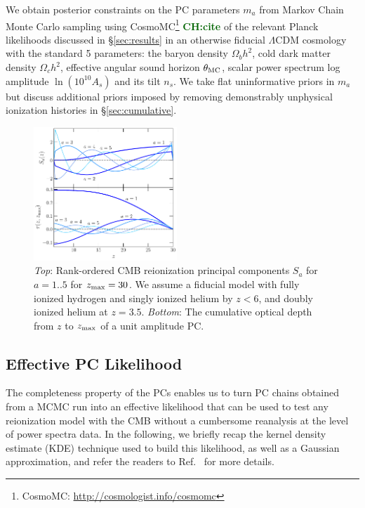 \documentclass[prd,twocolumn,amsmath,amssymb,floatfix,superscriptaddress,nofootinbib]{revtex4-1}
\newcommand{\zmax}{z_{\rm max}}
\newcommand{\todo}[1]{\textcolor{darkgreen}{\bf{#1}}}
\begin{document}
We obtain posterior constraints on the PC parameters $m_a$ from Markov Chain Monte Carlo sampling using CosmoMC\footnote{CosmoMC: \url{http://cosmologist.info/cosmomc}} \todo{CH:cite} of the relevant Planck likelihoods discussed in \S \ref{sec:results} in an otherwise fiducial $\Lambda$CDM cosmology with the standard 5 parameters: the baryon density $\Omega_b h^2$, cold dark matter density 
$\Omega_c h^2$, effective angular sound horizon $\theta_{\rm MC}$, scalar power spectrum log amplitude $\ln (10^{10} A_s)$ and
its tilt $n_s$.  We take flat uninformative
priors in $m_a$ but discuss additional priors imposed by
removing demonstrably  unphysical ionization histories in \S \ref{sec:cumulative}.

 \begin{figure}
          \includegraphics[width=0.48\textwidth]{paper/plots/pl18_plot_pub_xe_basis_tau_basis_zmax30_heinrich.pdf}
          \caption{\textit{Top}: Rank-ordered CMB reionization principal components $S_a$ for $a = 1..5$ for $\zmax = 30$. We assume a fiducial model with fully ionized hydrogen and singly ionized helium by $z<6$, and doubly ionized helium at $z = 3.5$.
          \textit{Bottom}: The cumulative optical depth from $z$ to $z_{\rm max}$ of a unit amplitude PC. } 
          \label{fig:xe}
\end{figure}

%
%
%
%

\subsection{Effective PC Likelihood}
\label{sec:KDE}
The completeness property of the PCs enables us to turn PC chains obtained from a MCMC run into an effective likelihood that can be used to test any reionization model with the CMB without a cumbersome reanalysis at the level of power spectra data. In the following, we briefly recap the kernel density estimate (KDE) technique used to build this likelihood, as well as a Gaussian approximation, and refer the readers to Ref.~\cite{Heinrich:2016ojb} for more details.
\end{document}
